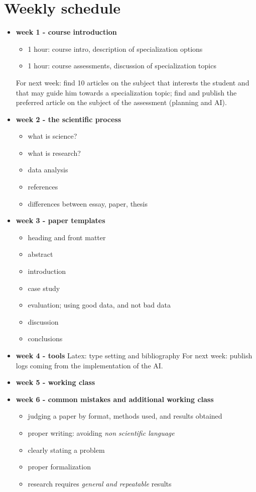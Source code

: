 \documentclass{article}
\begin{document}
\section{Weekly schedule}
\begin{itemize}
\item \textbf{week 1 - course introduction}
\begin{itemize}
\item 1 hour: course intro, description of specialization options 
\item 1 hour: course assessments, discussion of specialization topics
\end{itemize}
For next week: find 10 articles on the subject that interests the student and that may guide him towards a specialization topic; find and publish the preferred article on the subject of the assessment (planning and AI).

\item \textbf{week 2 - the scientific process}
\begin{itemize}
\item what is science?
\item what is research?
\item data analysis
\item references
\item differences between essay, paper, thesis
\end{itemize}

\item \textbf{week 3 - paper templates}
\begin{itemize}
\item heading and front matter
\item abstract
\item introduction
\item case study
\item evaluation; using good data, and not bad data
\item discussion
\item conclusions
\end{itemize}

\item \textbf{week 4 - tools}
Latex: type setting and bibliography
For next week: publish logs coming from the implementation of the AI.

\item \textbf{week 5 - working class}


\item \textbf{week 6 - common mistakes and additional working class} 
\begin{itemize}
\item judging a paper by format, methods used, and results obtained
\item proper writing: avoiding \textit{non scientific language}
\item clearly stating a problem
\item proper formalization
\item research requires \textit{general and repeatable} results
\end{itemize}


\end{itemize}
\end{document}
